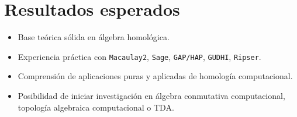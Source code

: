 \documentclass[12pt]{article}
\begin{document}
\section*{Resultados esperados}
\begin{itemize}
    \item Base teórica sólida en álgebra homológica.
    \item Experiencia práctica con \texttt{Macaulay2}, \texttt{Sage}, \texttt{GAP/HAP}, \texttt{GUDHI}, \texttt{Ripser}.
    \item Comprensión de aplicaciones puras y aplicadas de homología computacional.
    \item Posibilidad de iniciar investigación en álgebra conmutativa computacional, topología algebraica computacional o TDA.
\end{itemize}
\end{document}
